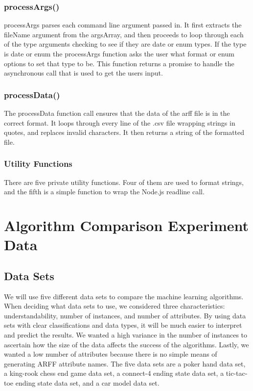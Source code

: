 \documentclass[11pt]{article} %
\begin{document}
\subsubsection{processArgs()}
processArgs parses each command line argument passed in. It first extracts the fileName argument from the argsArray, and then proceeds to loop through each of the type arguments checking to see if they are date or enum types. If the type is date or enum the processArgs function asks the user what format or enum options to set that type to be. This function returns a promise to handle the asynchronous call that is used to get the users input.

\subsubsection{processData()}
The processData function call ensures that the data of the arff file is in the correct format. It loops through every line of the .csv file wrapping strings in quotes, and replaces invalid characters. It then returns a string of the formatted file.

\subsubsection{Utility Functions}
There are five private utility functions. Four of them are used to format strings, and the fifth is a simple function to wrap the Node.js readline call.

\section{Algorithm Comparison Experiment Data}

\subsection{Data Sets}
We will use five different data sets to compare the machine learning algorithms.  When deciding what data sets to use, we considered three characteristics: understandability, number of instances, and number of attributes.  By using data sets with clear classifications and data types, it will be much easier to interpret and predict the results.  We wanted a high variance in the number of instances to ascertain how the size of the data affects the success of the algorithms.  Lastly, we wanted a low number of attributes because there is no simple means of generating ARFF attribute names.  The five data sets are a poker hand data set, a king-rook chess end game data set, a connect-4 ending state data set, a tic-tac-toe ending state data set, and a car model data set.
\end{document}
